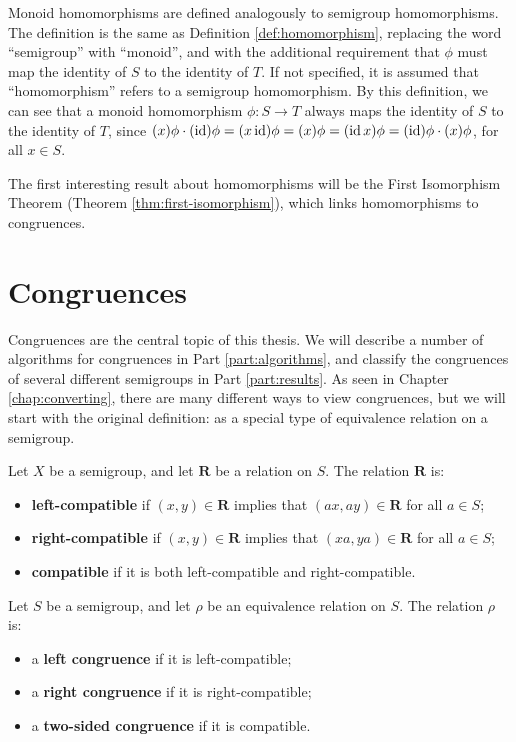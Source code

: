 Monoid homomorphisms are defined analogously to semigroup homomorphisms.  The
definition is the same as Definition \ref{def:homomorphism}, replacing the word
``semigroup'' with ``monoid'', and with the additional requirement that $\phi$
must map the identity of $S$ to the identity of $T$.  If not specified, it is
assumed that ``homomorphism'' refers to a semigroup homomorphism.  By this
definition, we can see that a monoid homomorphism $\phi:S \to T$ always maps the
identity of $S$ to the identity of $T$, since
$(x)\phi \cdot (\operatorname{id})\phi
= (x \operatorname{id})\phi
= (x)\phi
= (\operatorname{id} x)\phi
= (\operatorname{id})\phi \cdot (x)\phi$,
for all $x \in S$.

The first interesting result about homomorphisms will be the First Isomorphism
Theorem (Theorem \ref{thm:first-isomorphism}), which links homomorphisms to
congruences.

\section{Congruences}
\label{sec:intro-congs}

Congruences are the central topic of this thesis.  We will describe a number of
algorithms for congruences in Part \ref{part:algorithms}, and classify the
congruences of several different semigroups in Part \ref{part:results}.
As seen in Chapter \ref{chap:converting}, there are many different ways to view
congruences, but we will start with the original definition: as a special type
of equivalence relation on a semigroup.

\begin{definition}
  \label{def:compatible}
  Let $X$ be a semigroup, and let $\mathbf{R}$ be a relation on $S$.  The
  relation $\mathbf{R}$ is:
  \begin{itemize}
  \item \textbf{left-compatible} if $(x, y) \in \mathbf{R}$ implies that
    $(ax, ay) \in \mathbf{R}$ for all $a \in S$;
  \item \textbf{right-compatible} if $(x, y) \in \mathbf{R}$ implies that
    $(xa, ya) \in \mathbf{R}$ for all $a \in S$;
  \item \textbf{compatible} if it is both left-compatible and
    right-compatible.
  \end{itemize}
\end{definition}

\begin{definition}
  \label{def:congruence}
  Let $S$ be a semigroup, and let $\rho$ be an equivalence relation on $S$.  The
  relation $\rho$ is:
  \begin{itemize}
  \item a \textbf{left congruence} if it is left-compatible;
  \item a \textbf{right congruence} if it is right-compatible;
  \item a \textbf{two-sided congruence} if it is compatible.
  \end{itemize}
\end{definition}


